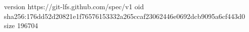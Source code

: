 version https://git-lfs.github.com/spec/v1
oid sha256:176dd52d20821e1f76576153332a265ccaf23062446e0692dcb9095a6cf443d0
size 196704
